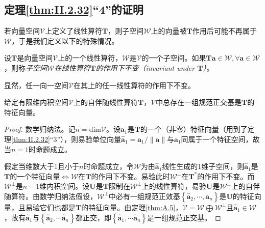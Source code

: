 \documentclass[main.tex]{subfiles}
\begin{document}
\subsection{定理\ref{thm:II.2.32}“4”的证明}
若向量空间$\mathcal{V}$上定义了线性算符$\mathbf{T}$，则子空间$\mathcal{W}$上的向量被$\mathbf{T}$作用后可能不再属于$\mathcal{W}$，于是我们定义以下的特殊情况。

\begin{definition}[子空间在线性算符的作用下不变]\label{def:A.7}
    设$\mathbf{T}$是向量空间$\mathcal{V}$上的一个线性算符，$\mathcal{W}$是$\mathcal{V}$的一个子空间。如果$\mathbf{Ta}\in\mathcal{W},\forall\mathbf{a}\in\mathcal{W}$，则称\emph{子空间$\mathcal{W}$在线性算符$\mathbf{T}$的作用下不变（invariant under $\mathbf{T}$）}。
\end{definition}

显然，任一向一空间$\mathcal{V}$在其上的任一线性算符的作用下不变。

\begin{theorem}
    给定有限维内积空间$\mathcal{V}$上的自伴随线性算符$\mathbf{T}$，$\mathcal{V}$中总存在一组规范正交基是$\mathbf{T}$的特征向量。
\end{theorem}
\begin{proof}
    数学归纳法。记$n=\mathrm{dim}\mathcal{V}$。设$\mathbf{a}_1$是$\mathbf{T}$的一个（非零）特征向量（用到了定理\ref{thm:II.2.32}“3”），则易验单位向量$\mathbf{\hat{a}}_1=\mathbf{a}_1/\left\|\mathbf{a}\right\|$与$\mathbf{a}_1$同属于一个特征空间，故当$n=1$时命题成立。

    假定当维数大于1且小于$n$时命题成立，令$\mathcal{W}$为由$\mathbf{\hat{a}}_1$线性生成的1维子空间，则$\mathbf{\hat{a}}_1$是$\mathbf{T}$的一个特征向量$\Leftrightarrow\mathcal{W}$在$\mathbf{T}$的作用下不变。易验此时$\mathcal{W}^\perp$在$\mathbf{T}^*$的作用下不变。而$\mathcal{W}^\perp$是$n-1$维内积空间。设$\mathbf{U}$是$\mathbf{T}$限制在$\mathcal{W}^\perp$上的线性算符，易验$\mathbf{U}$是$\mathcal{W}^\perp$上的自伴随算符。由数学归纳法假设，$\mathcal{W}^\perp$中必有一组规范正效基$\left\{\mathbf{\hat{a}}_2,\cdots,\mathbf{a}_n\right\}$是$\mathbf{U}$的特征向量，且易验它们也都是$\mathbf{T}$的特征向量。由定理\ref{thm:A.5}，$\mathcal{V}=\mathcal{W}\bigoplus\mathcal{W}^\perp$且$\mathbf{\hat{a}}_1\in\mathcal{W}$，故有$\mathbf{\hat{a}}_1$与$\left\{\mathbf{\hat{a}}_2,\cdots\mathbf{\hat{a}}_n\right\}$都正交，即$\left\{\mathbf{\hat{a}}_1,\cdots\mathbf{\hat{a}}_n\right\}$是一组规范正交基。
\end{proof}
\end{document}
